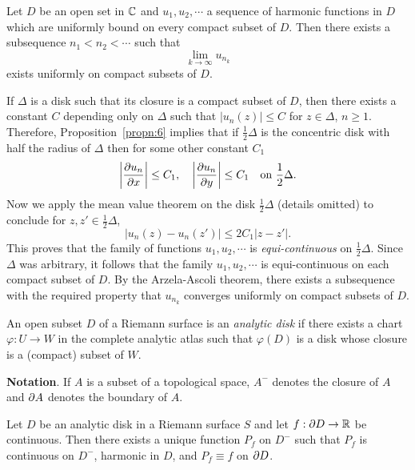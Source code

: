 \documentclass[a4paper,11pt]{article}
\begin{document}
\begin{propn}
  \label{propn:8}
  Let $D$ be an open set in ${\mathbb C}$ and $u_1, u_2, \cdots$ a sequence
  of harmonic functions in $D$ which are uniformly bound on every
  compact subset of $D$.  Then there exists a subsequence $n_1 < n_2 <
  \cdots$ such that
  $$
  \lim_{k\to \infty} u_{n_k}
  $$
  exists uniformly on compact subsets of $D$.
\end{propn}

\begin{myproof}
  If $\Delta$ is a disk such that its closure is a compact subset of
  $D$, then there exists a constant $C$ depending only on $\Delta$
  such that $|u_n(z)| \le C$ for $z \in \Delta$, $n \ge 1$.
  Therefore, Proposition~\ref{propn:6} implies that if
  $\frac{1}{2}\Delta$ is the concentric disk with half the radius of
  $\Delta$ then for some other constant $C_1$
  $$
  \left|\frac{\partial u_n}{\partial x}\right| \le C_1,\quad
  \left|\frac{\partial u_n}{\partial y}\right| \le C_1 \quad\text{on }
  \frac{1}{2}\Delta.
  $$
  Now we apply the mean value theorem on the disk $\frac{1}{2}\Delta$
  (details omitted) to conclude for $z, z' \in \frac{1}{2}\Delta$,
  $$
  |u_n(z) - u_n(z')| \le 2C_1 |z-z'|.
  $$
  This proves that the family of functions $u_1, u_2, \cdots$ is
  \emph{equi-continuous} on $\frac{1}{2}\Delta$.  Since $\Delta$ was
  arbitrary, it follows that the family $u_1, u_2, \cdots$ is
  equi-continuous on each compact subset of $D$.  By the Arzela-Ascoli
  theorem, there exists a subsequence with the required property that
  $u_{n_k}$ converges uniformly on compact subsets of $D$.
\end{myproof}

\begin{defn}
  \label{def:2}
  An open subset $D$ of a Riemann surface is an \emph{analytic disk}
  if there exists a chart $\varphi : U \to W$ in the complete analytic
  atlas such that $\varphi(D)$ is a disk whose closure is a (compact)
  subset of $W$.
\end{defn}

\textbf{Notation}.  If $A$ is a subset of a topological space, $A^-$
denotes the closure of $A$ and $\partial A$ denotes the boundary of $A$.

\begin{propn}
  \label{propn:9}
  Let $D$ be an analytic disk in a Riemann surface $S$ and let $f : \partial
  D \to {\mathbb R}$ be continuous.  Then there exists a unique function $P_f$
  on $D^-$ such that $P_f$ is continuous on $D^-$, harmonic in $D$,
  and $P_f \equiv f$ on $\partial D$.
\end{propn}
\end{document}
